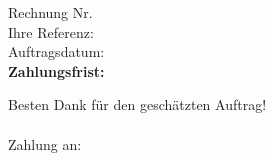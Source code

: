 \documentclass{chletter}
\title{}
\author{}
\begin{document}
  \begin{letter}{\custAdr}
  \date{\location, \today}
  \opening{Rechnung Nr. \quad \invNo \\ Ihre Referenz: \quad {} \\ Auftragsdatum: \quad \dat \\ \bf{Zahlungsfrist: \quad \cond}}
  \begin{invoice}{\currency}{\vat}
  
  \end{invoice}
  \closing{Besten Dank für den geschätzten Auftrag! \\\\ Zahlung an: \myBank}
  \end{letter}
  
\end{document}
